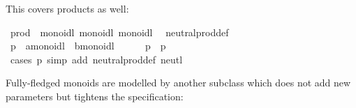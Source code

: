 \begin{isabellebody}
\begin{isamarkuptext}
This covers products as well:%
\end{isamarkuptext}%
\isamarkuptrue%
\isamarkupfalse%
\ prod\ {}{}\ {}monoidl{}\ monoidl{}\ monoidl\isanewline
{}\isanewline
\isanewline
{}\isamarkupfalse%
\isanewline
\ \ neutral{}prod{}def{}\ {}{}\ {}\ {}{}{}\ {}{}{}\isanewline
\isanewline
{}\isamarkupfalse%
%
\isadelimproof
\ %
\endisadelimproof
%
\isatagproof
{}\isamarkupfalse%
\isanewline
\ \ \isamarkupfalse%
\ p\ {}{}\ {}{}a{}monoidl\ {}\ {}b{}monoidl{}\isanewline
\ \ \isamarkupfalse%
\ {}{}\ {}\ p\ {}\ p{}\isanewline
\ \ \ \ \isamarkupfalse%
\ {}cases\ p{}\ {}simp\ add{}\ neutral{}prod{}def\ neutl{}\isanewline
{}\isamarkupfalse%
%
\endisatagproof
{\isafoldproof}%
%
\isadelimproof
%
\endisadelimproof
\isanewline
\isanewline
{}\isamarkupfalse%
%
\begin{isamarkuptext}%
\noindent Fully-fledged monoids are modelled by another
subclass which does not add new parameters but tightens the
specification:%
\end{isamarkuptext}%
\isamarkuptrue%
\isamarkupfalse%

\end{isabellebody}
